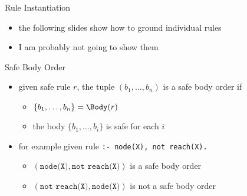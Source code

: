 \begin{frame}{Rule Instantiation}
  \vfill
  \begin{itemize}
    \item the following slides show how to ground individual rules
    \item I am probably not going to show them
  \end{itemize}
\end{frame}

\begin{frame}{Safe Body Order}
  \vfill
  \begin{itemize}
    \item given safe rule \(r\), the tuple \((b_1, \dots, b_n)\) is a \alert{safe body order} if
      \begin{itemize}
        \item \(\{ b_1 ,\dots , b_n \} = \Body(r) \)
        \item the body \(\{b_1, \dots, b_i\}\) is safe for each \(i\)
      \end{itemize}
      \pause
    \item for \alert{example} given rule \texttt{:- node(X), not reach(X).}
      \begin{itemize}
        \item \((\texttt{node(X)}, \texttt{not reach(X)})\) is a safe body order
        \item \((\texttt{not reach(X)}, \texttt{node(X)})\) is not a safe body order
      \end{itemize}
  \end{itemize}
\end{frame}

